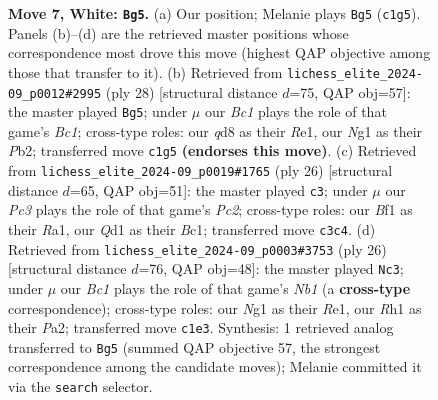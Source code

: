 \documentclass[11pt]{article}
\begin{document}
\begin{figure}[p]
\caption{\textbf{Move 7, White: \texttt{Bg5}.} (a) Our position; Melanie plays \texttt{Bg5} (\texttt{c1g5}). Panels (b)--(d) are the retrieved master positions whose correspondence most drove this move (highest QAP objective among those that transfer to it). (b) Retrieved from \texttt{lichess\_elite\_2024-09\_p0012\#2995} (ply 28) [structural distance $d$=75, QAP obj=57]: the master played \texttt{Bg5}; under $\mu$ our \emph{Bc1} plays the role of that game's \emph{Bc1}; cross-type roles: our \emph{q}d8 as their \emph{R}e1, our \emph{N}g1 as their \emph{P}b2; transferred move \texttt{c1g5} \textbf{(endorses this move)}. (c) Retrieved from \texttt{lichess\_elite\_2024-09\_p0019\#1765} (ply 26) [structural distance $d$=65, QAP obj=51]: the master played \texttt{c3}; under $\mu$ our \emph{Pc3} plays the role of that game's \emph{Pc2}; cross-type roles: our \emph{B}f1 as their \emph{R}a1, our \emph{Q}d1 as their \emph{B}c1; transferred move \texttt{c3c4}. (d) Retrieved from \texttt{lichess\_elite\_2024-09\_p0003\#3753} (ply 26) [structural distance $d$=76, QAP obj=48]: the master played \texttt{Nc3}; under $\mu$ our \emph{Bc1} plays the role of that game's \emph{Nb1} (a \textbf{cross-type} correspondence); cross-type roles: our \emph{N}g1 as their \emph{R}e1, our \emph{R}h1 as their \emph{P}a2; transferred move \texttt{c1e3}. Synthesis: 1 retrieved analog transferred to \texttt{Bg5} (summed QAP objective 57, the strongest correspondence among the candidate moves); Melanie committed it via the \texttt{search} selector.}
\label{fig:thought-m12}
\end{figure}

\clearpage
\end{document}
